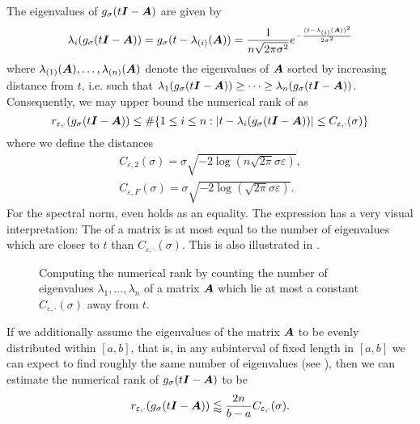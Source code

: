The eigenvalues of $g_{\sigma}(t\boldsymbol{I} - \boldsymbol{A})$ are given by
\begin{equation}
    \lambda_i(g_{\sigma}(t\boldsymbol{I} - \boldsymbol{A})) = g_{\sigma}(t - \lambda_{(i)}(\boldsymbol{A})) = \frac{1}{n \sqrt{2 \pi \sigma^2}} e^{-\frac{(t - \lambda_{(i)}(\boldsymbol{A}))^2}{2 \sigma^2}}
    \label{equ:3-nystrom-kernel-function-eigenvalues}
\end{equation}
where $\lambda_{(1)}(\boldsymbol{A}), \dots, \lambda_{(n)}(\boldsymbol{A})$ denote the
eigenvalues of $\boldsymbol{A}$ sorted by increasing
distance from $t$, i.e. such that $\lambda_1(g_{\sigma}(t\boldsymbol{I} - \boldsymbol{A})) \geq \dots \geq \lambda_n(g_{\sigma}(t\boldsymbol{I} - \boldsymbol{A}))$. Consequently,
we may upper bound the numerical rank of  as
\begin{equation}
    r_{\varepsilon, \cdot}(g_{\sigma}(t\boldsymbol{I} - \boldsymbol{A})) \leq \#\{1\leq i\leq n: |t - \lambda_i(g_{\sigma}(t\boldsymbol{I} - \boldsymbol{A}))| \leq C_{\varepsilon, \cdot}(\sigma)\}
    \label{equ:3-nystrom-kernel-numerical-rank}
\end{equation}
where we define the distances
\begin{align}
    C_{\varepsilon, 2}(\sigma) = \sigma \sqrt{-2 \log(n \sqrt{2 \pi} \sigma \varepsilon)}, \label{equ:3-nystrom-kernel-numerical-rank-spectral-constant} \\
    C_{\varepsilon, F}(\sigma) = \sigma \sqrt{-2 \log(\sqrt{2 \pi} \sigma \varepsilon)}. \label{equ:3-nystrom-kernel-numerical-rank-frobenius-constant} 
\end{align}
For the spectral norm,  even holds
as an equality.
The expression  has a very
visual interpretation: The  of a matrix is at most
equal to the number of eigenvalues which are closer to $t$ than $C_{\varepsilon, \cdot}(\sigma)$.
This is also illustrated in .\\
\begin{figure}[ht]
    \centering
    
    \caption{Computing the numerical rank by counting the number of eigenvalues
        $\lambda_1, \dots, \lambda_n$ of a matrix $\boldsymbol{A}$ which lie at most
        a constant $C_{\varepsilon, \cdot}(\sigma)$ away from $t$.}
    \label{fig:3-nystrom-numerical-rank-constant}
\end{figure}

If we additionally assume the eigenvalues of the matrix $\boldsymbol{A}$
to be evenly distributed within $[a, b]$, that is, in any subinterval of fixed length in
$[a, b]$ we can expect to find roughly the same number of eigenvalues (see ), then
we can estimate the numerical rank of $g_{\sigma}(t\boldsymbol{I} - \boldsymbol{A})$ to be
\begin{equation}
    r_{\varepsilon, \cdot}(g_{\sigma}(t\boldsymbol{I} - \boldsymbol{A})) \lessapprox \frac{2 n}{b - a} C_{\varepsilon, \cdot}(\sigma).
    \label{equ:3-nystrom-kernel-numerical-rank-even-eigenvalues}
\end{equation}

